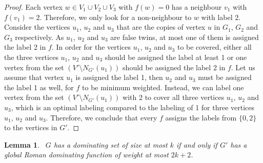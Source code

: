 \documentclass[preprint,12pt]{elsarticle}
\newtheorem{lemma}{Lemma}
\begin{document}
\begin{proof}
    Each vertex $w \in V_1 \cup V_2 \cup V_3$ with $f(w) = 0$ has a neighbour $v_1$ with $f(v_1) = 2$. Therefore, we only look for a non-neighbour to $w$ with label 2. Consider the vertices $u_1$, $u_2$ and $u_3$ that are the copies of vertex $u$ in $G_1$, $G_2$ and $G_3$ respectively. As $u_1$, $u_2$ and $u_3$ are false twins, at most one of them is assigned the label 2 in $f$. In order for the vertices $u_1$, $u_2$ and $u_3$ to be covered, either all the three vertices $u_1$, $u_2$ and $u_3$ should be assigned the label at least 1 or one vertex from the set $(V'\setminus N_{G'}(u_1))$ should be assigned the label 2 in $f$. Let us assume that vertex $u_1$ is assigned the label 1, then $u_2$ and $u_3$ must be assigned the label 1 as well, for $f$ to be minimum weighted. Instead, we can label one vertex from the set $(V'\setminus N_{G'}(u_1))$ with 2 to cover all three vertices $u_1$, $u_2$ and $u_3$, which is an optimal labeling compared to the labeling of 1 for three vertices $u_1$, $u_2$ and $u_3$. Therefore, we conclude that every $f$ assigns the labels from $\{0,2\}$ to the vertices in $G'$. 
\end{proof}
\begin{lemma}~\label{f3}
    $G$ has a dominating set of size at most $k$ if and only if $G'$ has a global Roman dominating function of weight at most $2k+2$.
\end{lemma}
\end{document}
